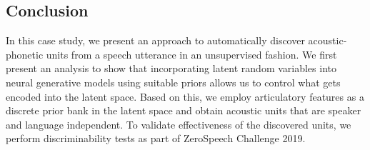 

\label{analysis}


\subsection{Conclusion}

In this case study, we present an approach to automatically discover acoustic-phonetic units from a speech utterance in an unsupervised fashion. We first present an analysis to show that incorporating latent random variables into neural generative models using suitable priors allows us to control what gets encoded into the latent space. Based on this, we employ articulatory features as a discrete prior bank in the latent space and obtain acoustic units that are speaker and language independent.  To validate effectiveness of the discovered units, we perform discriminability tests as part of ZeroSpeech Challenge 2019. 
